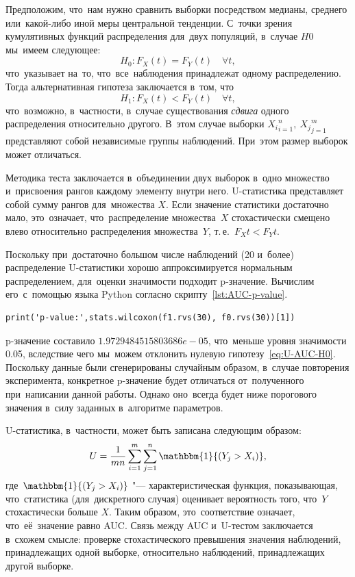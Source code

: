 \documentclass[]{scrreprt}
\begin{document}
Предположим, что~нам нужно сравнить выборки посредством медианы, среднего или~какой-либо иной меры центральной тенденции. С~точки зрения кумулятивных функций распределения для~двух популяций, в~случае $H0$ мы~имеем следующее:
\begin{equation}\label{eq:U-AUC-H0}
H_0: F_{X}(t) = F_{Y}(t) \quad \forall t,
\end{equation}
что~указывает на~то, что~все~наблюдения принадлежат одному распределению. Тогда альтернативная гипотеза заключается в~том, что
\begin{equation}\label{eq:U-AUC-H1}
H_1: F_{X}(t) < F_{Y}(t) \quad \forall t,
\end{equation}
что~возможно, в~частности, в~случае существования \emph{сдвига} одного распределения относительно другого. В~этом случае выборки ${X_{i}}_{i=1}^{n},\ {X_{j}}_{j=1}^{m}$ представляют собой независимые группы наблюдений. При~этом размер выборок может отличаться.

Методика теста заключается в~объединении двух выборок в~одно множество и~присвоения рангов каждому элементу внутри него. U-статистика представляет собой сумму рангов для~множества $X$. Если значение статистики достаточно мало, это~означает, что~распределение множества~$X$ стохастически смещено влево относительно распределения множества~$Y$, т.\,е.~$F_{X}{t} < F_{Y}{t}$.

Поскольку при~достаточно большом числе наблюдений (20 и~более) распределение U-статистики хорошо аппроксимируется нормальным распределением, для~оценки значимости подходит p-значение. Вычислим его~с~помощью языка Python согласно скрипту~\ref{lst:AUC-p-value}.
%
\begin{lstlisting}[float, caption = Вычисление p-значения для~тестовых данных, firstnumber=1, label= lst:AUC-p-value]
print('p-value:',stats.wilcoxon(f1.rvs(30), f0.rvs(30))[1])
\end{lstlisting}
%
p-значение составило $1.9729484515803686e-05$, что~меньше уровня значимости 0.05, вследствие чего мы~можем отклонить нулевую гипотезу~\ref{eq:U-AUC-H0}. Поскольку данные были сгенерированы случайным образом, в~случае повторения эксперимента, конкретное p-значение будет отличаться от~полученного при~написании данной работы. Однако оно~всегда будет ниже порогового значения в~силу заданных в~алгоритме параметров.

U-статистика, в~частности, может быть записана следующим образом:
\begin{equation}\label{eq:U-statistics}
U = \frac{1}{mn}\sum_{i=1}^{m}\sum_{j=1}^{n}\mathbbm{1}{(Y_{j}>X_{i})},
\end{equation}
где~$\mathbbm{1}{(Y_{j}>X_{i})}$ "--- характеристическая функция, показывающая, что~статистика (для~дискретного случая) оценивает вероятность того, что~$Y$ стохастически больше $X$. Таким образом, это~соответствие означает, что~её~значение равно AUC. Связь между AUC и~U-тестом заключается в~схожем смысле: проверке стохастического превышения значения наблюдений, принадлежащих одной выборке, относительно наблюдений, принадлежащих другой выборке.
\end{document}
